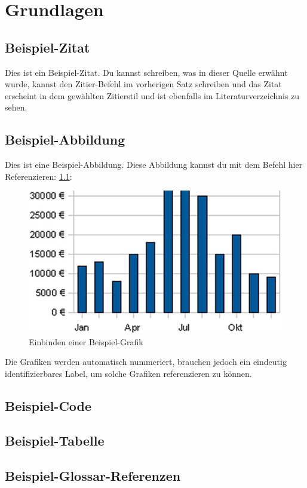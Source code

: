 \chapter{Grundlagen}\label{ch:grundlagen2}

\section{Beispiel-Zitat}\label{sec:beispiel-zitat}

Dies ist ein Beispiel-Zitat\cite{owasp-top10}.
Du kannst schreiben, was in dieser Quelle erwähnt wurde,
kannst den Zitier-Befehl im vorherigen Satz schreiben und das Zitat erscheint in dem gewählten Zitierstil und
ist ebenfalls im Literaturverzeichnis zu sehen.

\section{Beispiel-Abbildung}\label{sec:beispiel-abbildung}

Dies ist eine Beispiel-Abbildung.
Diese Abbildung kannst du mit dem Befehl hier Referenzieren: \cref{fig:anylabel}:

\begin{figure}[h!]
	\centering
	\includegraphics[width=\textwidth]{src/assets/some_graph}
	\caption{Einbinden einer Beispiel-Grafik}
	\label{fig:anylabel}
\end{figure}

Die Grafiken werden automatisch nummeriert, brauchen jedoch ein eindeutig identifizierbares Label, um
solche Grafiken referenzieren zu können.

\section{Beispiel-Code}\label{sec:beispiel-code}

\section{Beispiel-Tabelle}\label{sec:beispiel-Tabelle}

\section{Beispiel-Glossar-Referenzen}\label{sec:glossar-referenz}